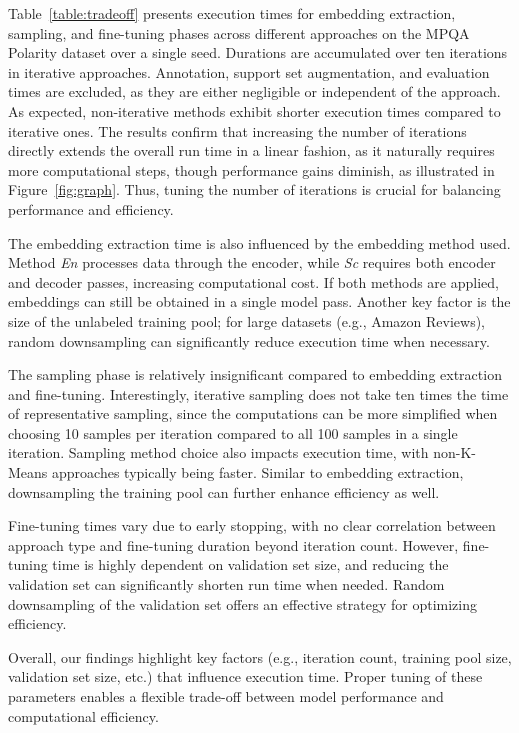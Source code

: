 \documentclass[11pt]{article}
\theoremstyle{definition}
\begin{document}
Table~\ref{table:tradeoff} presents execution times for embedding extraction, sampling, and fine-tuning phases across different approaches on the MPQA Polarity dataset over a single seed. Durations are accumulated over ten iterations in iterative approaches. Annotation, support set augmentation, and evaluation times are excluded, as they are either negligible or independent of the approach. As expected, non-iterative methods exhibit shorter execution times compared to iterative ones. The results confirm that increasing the number of iterations directly extends the overall run time in a linear fashion, as it naturally requires more computational steps, though performance gains diminish, as illustrated in Figure~\ref{fig:graph}. Thus, tuning the number of iterations is crucial for balancing performance and efficiency.

The embedding extraction time is also influenced by the embedding method used. Method \textit{En} processes data through the encoder, while \textit{Sc} requires both encoder and decoder passes, increasing computational cost. If both methods are applied, embeddings can still be obtained in a single model pass. Another key factor is the size of the unlabeled training pool; for large datasets (e.g., Amazon Reviews), random downsampling can significantly reduce execution time when necessary.

The sampling phase is relatively insignificant compared to embedding extraction and fine-tuning. Interestingly, iterative sampling does not take ten times the time of representative sampling, since the computations can be more simplified when choosing 10 samples per iteration compared to all 100 samples in a single iteration. Sampling method choice also impacts execution time, with non-K-Means approaches typically being faster. Similar to embedding extraction, downsampling the training pool can further enhance efficiency as well.

Fine-tuning times vary due to early stopping, with no clear correlation between approach type and fine-tuning duration beyond iteration count. However, fine-tuning time is highly dependent on validation set size, and reducing the validation set can significantly shorten run time when needed. Random downsampling of the validation set offers an effective strategy for optimizing efficiency. 

Overall, our findings highlight key factors (e.g., iteration count, training pool size, validation set size, etc.) that influence execution time. Proper tuning of these parameters enables a flexible trade-off between model performance and computational efficiency.
\end{document}
